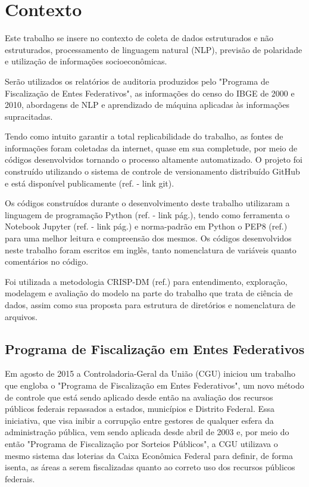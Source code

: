 \chapter{Contexto}
\label{cap:contexto}

Este trabalho se insere no contexto de coleta de dados estruturados e não estruturados, processamento de linguagem natural (NLP), previsão de polaridade e utilização de informações socioeconômicas.

Serão utilizados os relatórios de auditoria produzidos pelo "Programa de Fiscalização de Entes Federativos", as informações do censo do IBGE de 2000 e 2010, abordagens de NLP e aprendizado de máquina aplicadas às informações supracitadas.

Tendo como intuito garantir a total replicabilidade do trabalho, as fontes de informações foram coletadas da internet, quase em sua completude, por meio de códigos desenvolvidos tornando o processo altamente automatizado. O projeto foi construído utilizando o sistema de controle de versionamento distribuído GitHub e está disponível publicamente (ref. - link git).

Os códigos construídos durante o desenvolvimento deste trabalho utilizaram a linguagem de programação Python (ref. - link pág.), tendo como ferramenta o Notebook Jupyter (ref. - link pág.) e norma-padrão em Python o PEP8 (ref.) para uma melhor leitura e compreensão dos mesmos. Os códigos desenvolvidos neste trabalho foram escritos em inglês, tanto nomenclatura de variáveis quanto comentários no código.

Foi utilizada a metodologia CRISP-DM (ref.) para entendimento, exploração, modelagem e avaliação do modelo na parte do trabalho que trata de ciência de dados, assim como sua proposta para estrutura de diretórios e nomenclatura de arquivos.

\section{Programa de Fiscalização em Entes Federativos}
\label{sec:programa_de_fiscalizacao_em_entes_federativos}

Em agosto de 2015 a Controladoria-Geral da União (CGU) iniciou um trabalho que engloba o "Programa de Fiscalização em Entes Federativos", um novo método de controle que está sendo aplicado desde então na avaliação dos recursos públicos federais repassados a estados, municípios e Distrito Federal. Essa iniciativa, que visa inibir a corrupção entre gestores de qualquer esfera da administração pública, vem sendo aplicada desde abril de 2003 e, por meio do então "Programa de Fiscalização por Sorteios Públicos", a CGU utilizava o mesmo sistema das loterias da Caixa Econômica Federal para definir, de forma isenta, as áreas a serem fiscalizadas quanto ao correto uso dos recursos públicos federais.

